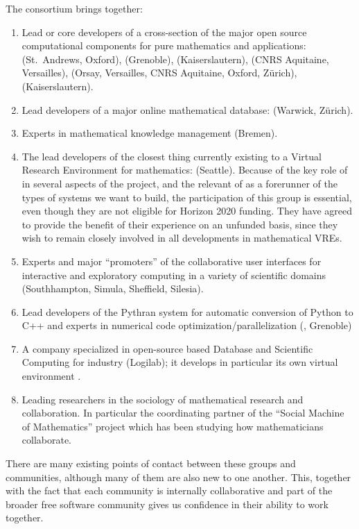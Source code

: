 \documentclass[noworkareas,deliverables,\classoptions]{euproposal}       %
\begin{document}
\begin{proposal}
The consortium brings together:
\begin{enumerate}
\item \label{mathsoftware} Lead or core developers of a cross-section of the major open
  source computational components for pure mathematics and applications: \GAP (St.~Andrews,
  Oxford), \Linbox (Grenoble), \MPIR (Kaiserslautern), \Pari (CNRS Aquitaine, Versailles), \Sage
  (Orsay, Versailles, CNRS Aquitaine, Oxford, Zürich), \Singular (Kaiserslautern).
\item \label{mathdb} Lead developers of a major online mathematical database: \LMFDB
  (Warwick, Zürich).
\item \label{mathknowledge} Experts in mathematical knowledge management (Bremen).
\item \label{smc} The lead developers of the closest thing currently existing to a Virtual
  Research Environment for mathematics: \SMC (Seattle). Because of the key role of \Sage
  in several aspects of the project, and the relevant of \SMC as a forerunner of the types
  of systems we want to build, the participation of this group is essential, even though
  they are not eligible for Horizon 2020 funding. They have agreed to provide the benefit
  of their experience on an unfunded basis, since they wish to remain closely involved in
  all developments in mathematical VREs.
\item \label{jupyter} Experts and major ``promoters'' of the \Jupyter collaborative user
  interfaces for interactive and exploratory computing in a variety of scientific domains
  (Southhampton, Simula, Sheffield, Silesia).
\item \label{pythran} Lead developers of the Pythran system for automatic conversion of
  Python to C++ and experts in numerical code optimization/parallelization (,
  Grenoble)
\item \label{logilab} A company specialized in open-source based Database and Scientific
  Computing for industry (Logilab); it develops in particular its own virtual environment
  \Simulagora.
\item \label{social} Leading researchers in the sociology of mathematical research and
  collaboration. In particular the coordinating partner of the ``Social Machine of
  Mathematics'' project which has been studying how mathematicians collaborate.
\end{enumerate}





There are many existing points of contact between these groups  and
communities, although many of them are also new to one another. This,
together with the fact that each community is internally collaborative
and part of the broader free software community gives us confidence in
their ability to work together.


\end{proposal}
\end{document}
